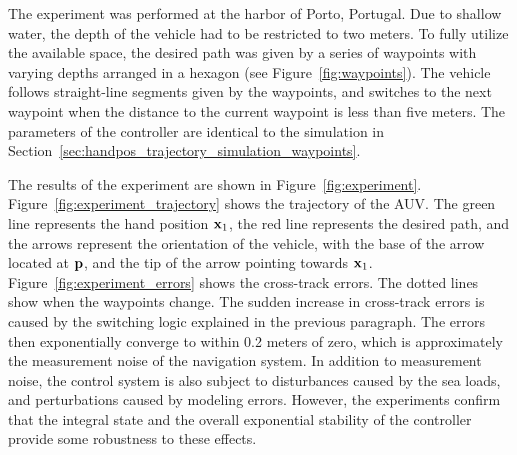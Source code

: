 
The experiment was performed at the harbor of Porto, Portugal.
Due to shallow water, the depth of the vehicle had to be restricted to two meters.
To fully utilize the available space, the desired path was given by a series of waypoints with varying depths arranged in a hexagon (see Figure~\ref{fig:waypoints}).
The vehicle follows straight-line segments given by the waypoints, and switches to the next waypoint when the distance to the current waypoint is less than five meters.
The parameters of the controller are identical to the simulation in Section~\ref{sec:handpos_trajectory_simulation_waypoints}.

The results of the experiment are shown in Figure~\ref{fig:experiment}.
Figure~\ref{fig:experiment_trajectory} shows the trajectory of the AUV.
The green line represents the hand position $\mathbf{x}_1$, the red line represents the desired path, and the arrows represent the orientation of the vehicle, with the base of the arrow located at $\mathbf{p}$, and the tip of the arrow pointing towards $\mathbf{x}_1$.
Figure~\ref{fig:experiment_errors} shows the cross-track errors.
The dotted lines show when the waypoints change.
The sudden increase in cross-track errors is caused by the switching logic explained in the previous paragraph.
The errors then exponentially converge to within 0.2 meters of zero, which is approximately the measurement noise of the navigation system.
In addition to measurement noise, the control system is also subject to disturbances caused by the sea loads, and perturbations caused by modeling errors.
However, the experiments confirm that the integral state and the overall exponential stability of the controller provide some robustness to these effects.
